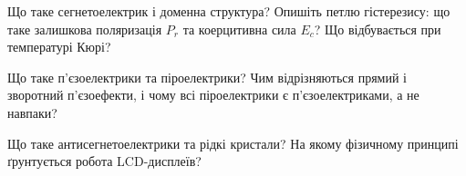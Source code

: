 \begin{Questions}
\begin{quizlist}
	\item Що таке сегнетоелектрик і доменна структура? Опишіть петлю гістерезису: що таке залишкова поляризація $P_r$ та коерцитивна сила $E_c$? Що відбувається при температурі Кюрі?
	\item Що таке п'єзоелектрики та піроелектрики? Чим відрізняються прямий і зворотний п'єзоефекти, і чому всі піроелектрики є п'єзоелектриками, а не навпаки?
	\item Що таке антисегнетоелектрики та рідкі кристали? На якому фізичному принципі ґрунтується робота LCD-дисплеїв?
\end{quizlist}
\end{Questions}